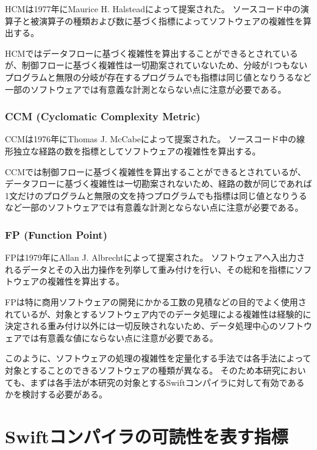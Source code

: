 HCMは1977年にMaurice H. Halsteadによって提案された。
ソースコード中の演算子と被演算子の種類および数に基づく指標によってソフトウェアの複雑性を算出する。

HCMではデータフローに基づく複雑性を算出することができるとされているが、制御フローに基づく複雑性は一切勘案されていないため、分岐が1つもないプログラムと無限の分岐が存在するプログラムでも指標は同じ値となりうるなど一部のソフトウェアでは有意義な計測とならない点に注意が必要である。

\subsubsection{CCM (Cyclomatic Complexity Metric)}

CCMは1976年にThomas J. McCabeによって提案された。
ソースコード中の線形独立な経路の数を指標としてソフトウェアの複雑性を算出する。

CCMでは制御フローに基づく複雑性を算出することができるとされているが、データフローに基づく複雑性は一切勘案されないため、経路の数が同じであれば1文だけのプログラムと無限の文を持つプログラムでも指標は同じ値となりうるなど一部のソフトウェアでは有意義な計測とならない点に注意が必要である。

\subsubsection{FP (Function Point)}

FPは1979年にAllan J. Albrechtによって提案された。
ソフトウェアへ入出力されるデータとその入出力操作を列挙して重み付けを行い、その総和を指標にソフトウェアの複雑性を算出する。

FPは特に商用ソフトウェアの開発にかかる工数の見積などの目的でよく使用されているが、対象とするソフトウェア内でのデータ処理による複雑性は経験的に決定される重み付け以外には一切反映されないため、データ処理中心のソフトウェアでは有意義な値にならない点に注意が必要である。

\vspace{2em}

このように、ソフトウェアの処理の複雑性を定量化する手法では各手法によって対象とすることのできるソフトウェアの種類が異なる。
そのため本研究においても、まずは各手法が本研究の対象とするSwiftコンパイラに対して有効であるかを検討する必要がある。


\section{Swiftコンパイラの可読性を表す指標}
\label{issue:barometer}

